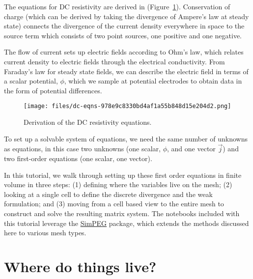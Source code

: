 \documentclass[Journal,InsideFigs,DoubleSpace,12pt,letterpaper]{ascelike-new}
\begin{document}
The equations for DC resistivity are derived in (Figure~\ref{dc-eqns}). Conservation of charge (which can be derived by taking the divergence of Ampere's law at steady state) connects the divergence of the current density everywhere in space to the source term which consists of two point sources, one positive and one negative.

The flow of current sets up electric fields according to Ohm's law, which relates current density to electric fields through the electrical conductivity. From Faraday's law for steady state fields, we can describe the electric field in terms of a scalar potential, $\phi$, which we sample at potential electrodes to obtain data in the form of potential differences.

\begin{figure}[!htbp]
\centering
\texttt{[image: files/dc-eqns-978e9c8330bd4af1a55b848d15e204d2.png]}
\caption{Derivation of the DC resistivity equations.}
\label{dc-eqns}
\end{figure}

To set up a solvable system of equations, we need the same number of unknowns as equations, in this case two unknowns (one scalar, $\phi$, and one vector $\vec{j}$) and two first-order equations (one scalar, one vector).

In this tutorial, we walk through setting up these first order equations in finite volume in three steps: (1) defining where the variables live on the mesh; (2) looking at a single cell to define the discrete divergence and the weak formulation; and (3) moving from a cell based view to the entire mesh to construct and solve the resulting matrix system. The notebooks included with this tutorial leverage the \href{http://simpeg.xyz/}{SimPEG} package, which extends the methods discussed here to various mesh types.

\section{Where do things live?}\label{Where do things live?}
\end{document}
